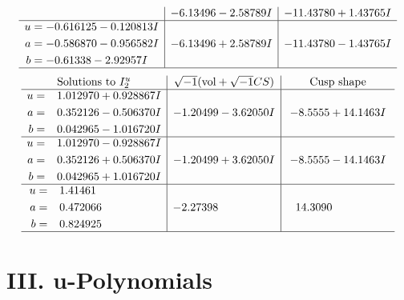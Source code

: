 \documentclass[1p]{elsarticle_modified}
\theoremstyle{definition}
\newcommand{\I}{\sqrt{-1}}
\begin{document}
$$\begin{array}{c|c|c}
 & -6.13496 - 2.58789 I & -11.43780 + 1.43765 I \\ \hline\begin{aligned}
u &= -0.616125 - 0.120813 I \\
a &= -0.586870 - 0.956582 I \\
b &= -0.61338 - 2.92957 I\end{aligned}
 & -6.13496 + 2.58789 I & -11.43780 - 1.43765 I\\
 \hline 
 \end{array}$$\newpage$$\begin{array}{c|c|c}  
\text{Solutions to }I^u_{2}& \I (\text{vol} + \sqrt{-1}CS) & \text{Cusp shape}\\
 \hline 
\begin{aligned}
u &= \phantom{-}1.012970 + 0.928867 I \\
a &= \phantom{-}0.352126 - 0.506370 I \\
b &= \phantom{-}0.042965 - 1.016720 I\end{aligned}
 & -1.20499 - 3.62050 I & -8.5555 + 14.1463 I \\ \hline\begin{aligned}
u &= \phantom{-}1.012970 - 0.928867 I \\
a &= \phantom{-}0.352126 + 0.506370 I \\
b &= \phantom{-}0.042965 + 1.016720 I\end{aligned}
 & -1.20499 + 3.62050 I & -8.5555 - 14.1463 I \\ \hline\begin{aligned}
u &= \phantom{-}1.41461\phantom{ +0.000000I} \\
a &= \phantom{-}0.472066\phantom{ +0.000000I} \\
b &= \phantom{-}0.824925\phantom{ +0.000000I}\end{aligned}
 & -2.27398\phantom{ +0.000000I} & \phantom{-}14.3090\phantom{ +0.000000I}\\
 \hline 
 \end{array}$$\newpage
\newpage\renewcommand{\arraystretch}{1}
\centering \section*{ III. u-Polynomials}
\end{document}

